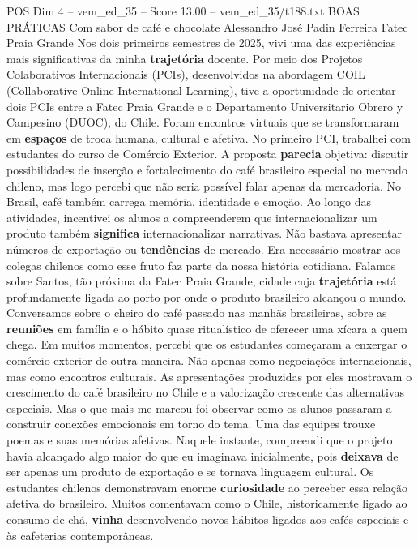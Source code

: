 \begin{textsample}{POS Dim 4 – vem\_ed\_35 – Score 13.00 – vem\_ed\_35/t188.txt}  \label{ex:f4_pos_003}
BOAS PRÁTICAS Com sabor de café e chocolate Alessandro José Padin Ferreira Fatec Praia Grande Nos dois primeiros semestres de 2025, vivi uma das experiências mais significativas da minha \textbf{trajetória} docente.
Por meio dos Projetos Colaborativos Internacionais (PCIs), desenvolvidos na abordagem COIL (Collaborative Online International Learning), tive a oportunidade de orientar dois PCIs entre a Fatec Praia Grande e o Departamento Universitario Obrero y Campesino (DUOC), do Chile.
Foram encontros virtuais que se transformaram em \textbf{espaços} de troca humana, cultural e afetiva.
No primeiro PCI, trabalhei com estudantes do curso de Comércio Exterior.
A proposta \textbf{parecia} objetiva: discutir possibilidades de inserção e fortalecimento do café brasileiro especial no mercado chileno, mas logo percebi que não seria possível falar apenas da mercadoria.
No Brasil, café também carrega memória, identidade e emoção.
Ao longo das atividades, incentivei os alunos a compreenderem que internacionalizar um produto também \textbf{significa} internacionalizar narrativas.
Não bastava apresentar números de exportação ou \textbf{tendências} de mercado.
Era necessário mostrar aos colegas chilenos como esse fruto faz parte da nossa história cotidiana.
Falamos sobre Santos, tão próxima da Fatec Praia Grande, cidade cuja \textbf{trajetória} está profundamente ligada ao porto por onde o produto brasileiro alcançou o mundo.
Conversamos sobre o cheiro do café passado nas manhãs brasileiras, sobre as \textbf{reuniões} em família e o hábito quase ritualístico de oferecer uma xícara a quem chega.
Em muitos momentos, percebi que os estudantes começaram a enxergar o comércio exterior de outra maneira.
Não apenas como negociações internacionais, mas como encontros culturais.
As apresentações produzidas por eles mostravam o crescimento do café brasileiro no Chile e a valorização crescente das alternativas especiais.
Mas o que mais me marcou foi observar como os alunos passaram a construir conexões emocionais em torno do tema.
Uma das equipes trouxe poemas e suas memórias afetivas.
Naquele instante, compreendi que o projeto havia alcançado algo maior do que eu imaginava inicialmente, pois \textbf{deixava} de ser apenas um produto de exportação e se tornava linguagem cultural.
Os estudantes chilenos demonstravam enorme \textbf{curiosidade} ao perceber essa relação afetiva do brasileiro.
Muitos comentavam como o Chile, historicamente ligado ao consumo de chá, \textbf{vinha} desenvolvendo novos hábitos ligados aos cafés especiais e às cafeterias contemporâneas.

\end{textsample}
